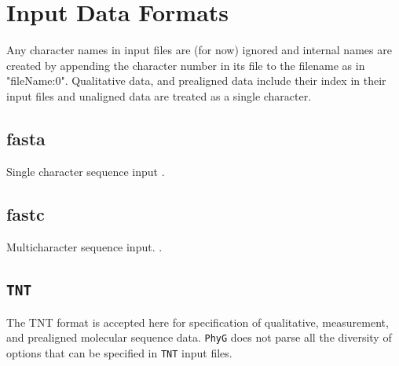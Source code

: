 \documentclass[11pt]{book}
\newcommand{\phyg}{\texttt{PhyG} }
\begin{document}
{{		
\section{Input Data Formats}
	Any character names in input files are (for now) ignored and internal names are created
	by appending the character number in its file to the filename as in "fileName:0".
	Qualitative data, and prealigned data include their index in their input files and unaligned 
	data are treated as a single character.
	
	\subsection{fasta}
		Single character sequence input \citep{PearsonandLipman1988}.
		
	\subsection{fastc}
		Multicharacter sequence input.  \citep{WheelerandWashburn2019}.
		
	\subsection{\texttt{TNT}}
		The TNT \citep{Goloboffetal2008} format is accepted here for specification of qualitative,
		measurement, and prealigned molecular sequence data. \phyg does not parse all the
		diversity of options that can be specified in \texttt{TNT} input files.\\
		
}}
\end{document}
